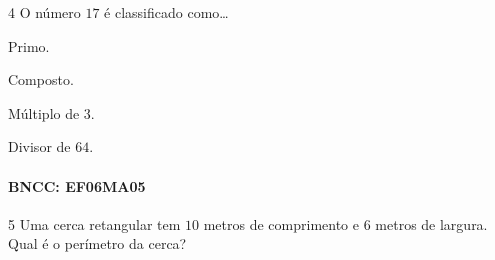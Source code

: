 {%

\num{4}  O número $17$ é classificado como\ldots{}

\begin{escolha}
\item
  Primo.
\item
  Composto.
\item
  Múltiplo de $3$.
\item
  Divisor de $64$.
\end{escolha}

\paragraph{BNCC: EF06MA05 }



\num{5}  Uma cerca retangular tem $10$ metros de comprimento e $6$ metros de
largura. Qual é o perímetro da cerca?

}
